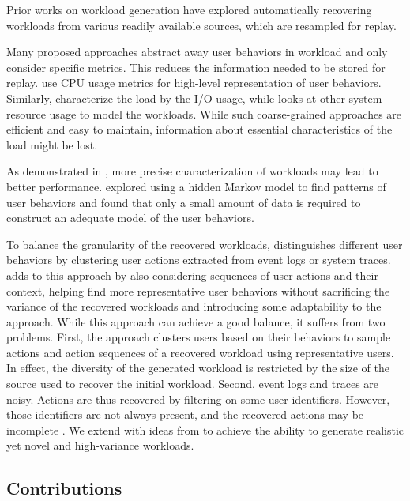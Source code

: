 Prior works on workload generation have explored automatically recovering workloads from various readily available sources, which are resampled for replay.

Many proposed approaches abstract away user behaviors in workload and only consider specific metrics. This reduces the information needed to be stored for replay. \cite{Shang2015-gj, Cohen2005-mn} use CPU usage metrics for high-level representation of user behaviors. Similarly, \cite{Haghdoost2017-bc, Yadwadkar2010-ml, Busch2015-yo, Seo2014-xv} characterize the load by the I/O usage, while \cite{Cortez2017-nc} looks at other system resource usage to model the workloads. While such coarse-grained approaches are efficient and easy to maintain, information about essential characteristics of the load might be lost.

As demonstrated in \cite{Cohen2005-mn}, more precise characterization of workloads may lead to better performance. \cite{Yadwadkar2010-ml} explored using a hidden Markov model to find patterns of user behaviors and found that only a small amount of data is required to construct an adequate model of the user behaviors.

To balance the granularity of the recovered workloads, \cite{Syer2017-ek, Vogele2018-zz, Summers2016-jj, Xi2011-ki, Hassan2008-nj} distinguishes different user behaviors by clustering user actions extracted from event logs or system traces. \cite{Chen2019-fu} adds to this approach by also considering sequences of user actions and their context, helping find more representative user behaviors without sacrificing the variance of the recovered workloads and introducing some adaptability to the approach. While this approach can achieve a good balance, it suffers from two problems. First, the approach clusters users based on their behaviors to sample actions and action sequences of a recovered workload using representative users. In effect, the diversity of the generated workload is restricted by the size of the source used to recover the initial workload. Second, event logs and traces are noisy. Actions are thus recovered by filtering on some user identifiers. However, those identifiers are not always present, and the recovered actions may be incomplete \cite{Zhao2023-nh}. We extend \cite{Chen2019-fu} with ideas from \cite{Yadwadkar2010-ml} to achieve the ability to generate realistic yet novel and high-variance workloads.

\subsection{Contributions}

